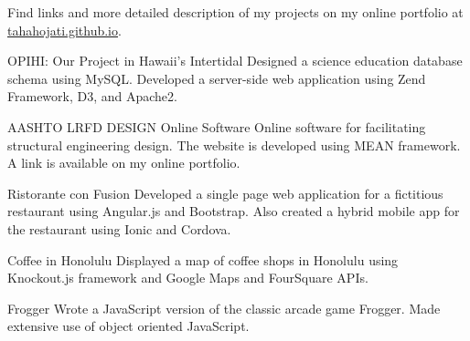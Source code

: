 
	Find links and more detailed description of my projects on my online portfolio at \mbox{\href{http://tahahojati.github.io}{tahahojati.github.io}}.
\begin{cventries}
	\cventry
	{OPIHI: Our Project in Hawaii's Intertidal}
	{}
	{}
	{}
	{Designed a science education database schema using MySQL. Developed a server-side web application using Zend Framework, D3, and Apache2.}
	
	\cventry
	{AASHTO LRFD DESIGN Online Software}
	{}
	{}
	{}
	{Online software for facilitating structural engineering design. The website is developed using MEAN framework. A link is available on my online portfolio. }

	\cventry
	{Ristorante con Fusion
	}
	{}
	{}
	{}
	{Developed a single page web application for a fictitious restaurant using Angular.js and Bootstrap.  Also created a hybrid mobile app for the restaurant using Ionic and Cordova.}

	\cventry
	{Coffee in Honolulu
	}
	{}
	{}
	{}
	{Displayed a map of coffee shops in Honolulu using Knockout.js framework and Google Maps and FourSquare APIs.}

	\cventry
	{Frogger
	}
	{}
	{}
	{}
	{Wrote a JavaScript version of the classic arcade game Frogger. Made extensive use of object oriented JavaScript.}



\end{cventries}
